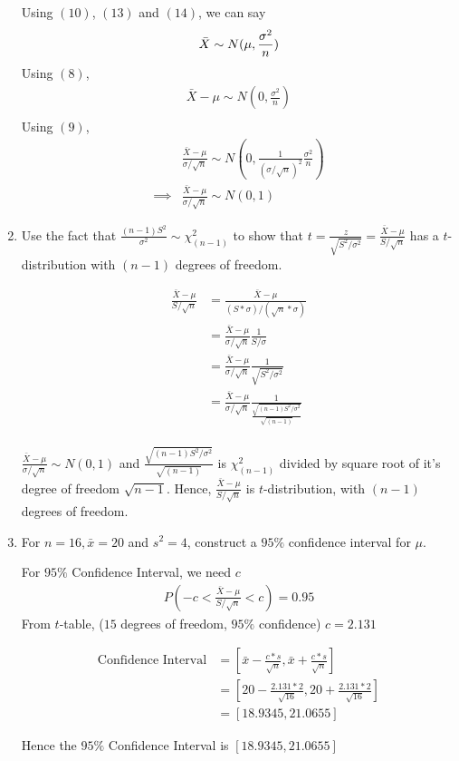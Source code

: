 \begin{enumerate}
Using $(10)$, $(13)$ and $(14)$, we can say
\begin{equation}
\bar{X} \sim  N(\mu , \frac{\sigma^2}{n})\\
\end{equation}
Using $(8)$, 
\begin{align*}
\bar{X} - \mu \sim  N(0  , \frac{\sigma^2}{n})\\
\end{align*}
Using $(9)$, 
\begin{align*}
&\frac{\bar{X} - \mu}{\sigma / \sqrt{n}} \sim  N(0  , \frac{1}{(\sigma / \sqrt{n})^2}\frac{\sigma^2}{n})\\
\implies &\frac{\bar{X} - \mu}{\sigma / \sqrt{n}} \sim N(0,1)
\end{align*}


\item 
\noindent Use the fact that $\frac{(n - 1)S^2}{\sigma^2} \sim \chi^2_{(n-1)}$ to show that $t = \frac{z}{\sqrt{S^2/\sigma^2}} = \frac{\bar{X} - \mu}{S / \sqrt{n}}$ has a $t$-distribution with $(n - 1)$ degrees of freedom.

\begin{align*}
\frac{\bar{X} - \mu}{S / \sqrt{n}} &= \frac{\bar{X} - \mu}{(S * \sigma)/(\sqrt{n} * 
\sigma)}\\
&= \frac{\bar{X} - \mu}{\sigma/\sqrt{n}}\frac{1}{S/\sigma}\\
&= \frac{\bar{X} - \mu}{\sigma/\sqrt{n}}\frac{1}{\sqrt{S^2/\sigma^2}}\\
&= \frac{\bar{X} - \mu}{\sigma/\sqrt{n}}\frac{1}{\frac{\sqrt{(n-1)S^2/\sigma^2}}{\sqrt{(n-1)}}}\\
\end{align*}

$\frac{\bar{X} - \mu}{\sigma/\sqrt{n}} \sim N(0,1)$ and $\frac{\sqrt{(n-1)S^2/\sigma^2}}{\sqrt{(n-1)}}$ is $\chi^2_{(n-1)}$ divided by square root of it's degree of freedom $\sqrt{n-1}$. Hence, $\frac{\bar{X} - \mu}{S / \sqrt{n}}$ is $t$-distribution, with $(n-1)$ degrees of freedom. 

\item 
For $n = 16, \bar{x} = 20$ and $s^2 = 4$, construct a $95\%$ confidence interval for $\mu$.

For $95\%$ Confidence Interval, we need $c$
\begin{align*}
P(-c < \frac{\bar{X} - \mu}{S / \sqrt{n}} < c) = 0.95
\end{align*}
From $t$-table, ($15$ degrees of freedom, $95\%$ confidence) $c = 2.131$


\begin{align*}
\text{Confidence Interval} &= [\bar{x} - \frac{c * s}{\sqrt{n}} , \bar{x} + \frac{c * s}{\sqrt{n}}]\\
&=[20 - \frac{2.131 * 2}{\sqrt{16}} , 20 + \frac{2.131 * 2}{\sqrt{16}}]\\
&=[18.9345 ,   21.0655]
\end{align*}

Hence the $95\%$ Confidence Interval is $[18.9345 , 21.0655]$


\end{enumerate}